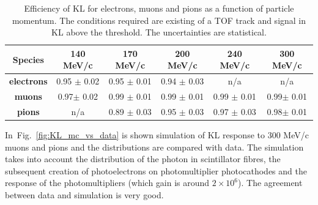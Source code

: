   \begin{table}[htb]
  	\begin{center}
  		\begin{tabular}{c|c|c|c|c|c} 
  			\hline
  			\textbf{Species} &\textbf{140 MeV/c} & \textbf{170 MeV/c} & \textbf{200 MeV/c}	&\textbf{240 MeV/c} &\textbf{300 MeV/c}\\
  			\hline
  			\textbf{electrons} & 0.95 $\pm$ 0.02  & 0.95 $\pm$ 0.01 & 0.94 $\pm$ 0.03 & n/a & n/a \\
  			\hline
  			\textbf{muons} &  0.97$\pm$ 0.02 & 0.99 $\pm$ 0.01  & 0.99 $\pm$  0.01 & 0.99 $\pm$ 0.01 & 0.99$\pm$ 0.01\\
  			\hline
  			\textbf{pions} &  n/a  & 0.89 $\pm$ 0.03  & 0.95 $\pm$ 0.03 & 0.97 $\pm$ 0.03 & 0.98$\pm$ 0.01\\
  			\hline
  		\end{tabular}
  		\caption{Efficiency of KL for electrons, muons and pions as a function of particle momentum. The conditions required are existing of a TOF track and signal in KL above the threshold. The uncertainties are statistical.}
  		\label{tab:KL_eff}
  	\end{center}
  \end{table}

In~Fig.~\ref{fig:KL_mc_vs_data} is shown simulation of KL response to 300 MeV/c muons and pions and the distributions are compared with data.
The simulation takes into account the distribution of the photon in scintillator fibres, the subsequent creation of photoelectrons on photomultiplier photocathodes and the response of the photomultipliers (which gain is around $2 \times 10^6$).
The agreement between data and simulation is very good.


